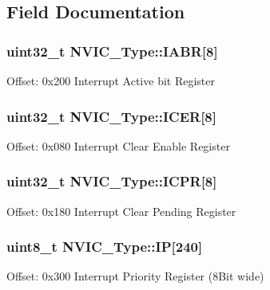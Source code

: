 \subsection{Field Documentation}
\subsubsection[{\texorpdfstring{I\+A\+BR}{IABR}}]{ uint32\+\_\+t N\+V\+I\+C\+\_\+\+Type\+::\+I\+A\+BR\mbox{[}8\mbox{]}}\hypertarget{structNVIC__Type_a33e917b381e08dabe4aa5eb2881a7c11}{}\label{structNVIC__Type_a33e917b381e08dabe4aa5eb2881a7c11}
Offset\+: 0x200 Interrupt Active bit Register 
\subsubsection[{\texorpdfstring{I\+C\+ER}{ICER}}]{ uint32\+\_\+t N\+V\+I\+C\+\_\+\+Type\+::\+I\+C\+ER\mbox{[}8\mbox{]}}\hypertarget{structNVIC__Type_a1965a2e68b61d2e2009621f6949211a5}{}\label{structNVIC__Type_a1965a2e68b61d2e2009621f6949211a5}
Offset\+: 0x080 Interrupt Clear Enable Register 
\subsubsection[{\texorpdfstring{I\+C\+PR}{ICPR}}]{ uint32\+\_\+t N\+V\+I\+C\+\_\+\+Type\+::\+I\+C\+PR\mbox{[}8\mbox{]}}\hypertarget{structNVIC__Type_a46241be64208436d35c9a4f8552575c5}{}\label{structNVIC__Type_a46241be64208436d35c9a4f8552575c5}
Offset\+: 0x180 Interrupt Clear Pending Register 
\subsubsection[{\texorpdfstring{IP}{IP}}]{ uint8\+\_\+t N\+V\+I\+C\+\_\+\+Type\+::\+IP\mbox{[}240\mbox{]}}\hypertarget{structNVIC__Type_a6524789fedb94623822c3e0a47f3d06c}{}\label{structNVIC__Type_a6524789fedb94623822c3e0a47f3d06c}
Offset\+: 0x300 Interrupt Priority Register (8\+Bit wide) 
